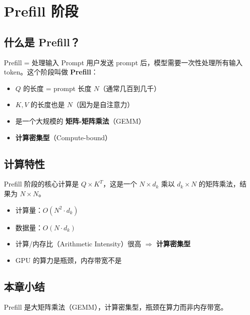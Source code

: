 \section{Prefill 阶段}

\subsection{什么是 Prefill？}

\begin{importantbox}{Prefill = 处理输入 Prompt}
用户发送 prompt 后，模型需要一次性处理所有输入 token。这个阶段叫做 \textbf{Prefill}：
\begin{itemize}
  \item $Q$ 的长度 = prompt 长度 $N$（通常几百到几千）
  \item $K, V$ 的长度也是 $N$（因为是自注意力）
  \item 是一个大规模的 \textbf{矩阵-矩阵乘法}（GEMM）
  \item \textbf{计算密集型}（Compute-bound）
\end{itemize}
\end{importantbox}

\subsection{计算特性}

Prefill 阶段的核心计算是 $Q \times K^T$，这是一个 $N \times d_k$ 乘以 $d_k \times N$ 的矩阵乘法，结果为 $N \times N$。

\begin{itemize}
  \item 计算量：$O(N^2 \cdot d_k)$
  \item 数据量：$O(N \cdot d_k)$
  \item 计算/内存比（Arithmetic Intensity）很高 $\Rightarrow$ \textbf{计算密集型}
  \item GPU 的算力是瓶颈，内存带宽不是
\end{itemize}

\subsection{本章小结}

Prefill 是大矩阵乘法（GEMM），计算密集型，瓶颈在算力而非内存带宽。

